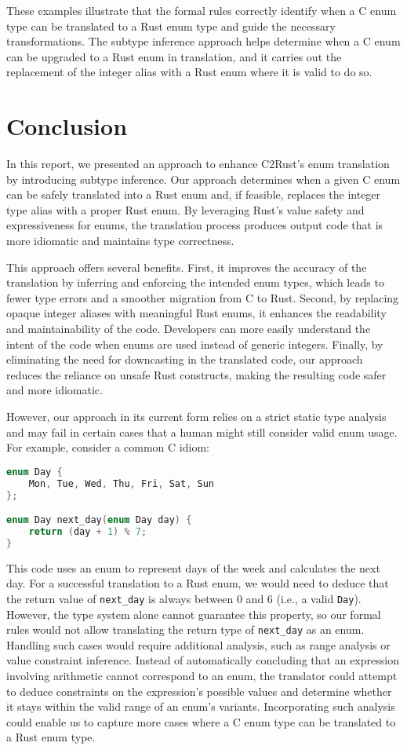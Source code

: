\documentclass[peerreview, 10pt]{IEEEtran}
\begin{document}
These examples illustrate that the formal rules correctly identify when a C enum type can be translated to a Rust enum type and guide the necessary transformations. The subtype inference approach helps determine when a C enum can be upgraded to a Rust enum in translation, and it carries out the replacement of the integer alias with a Rust enum where it is valid to do so.

\section{Conclusion}
In this report, we presented an approach to enhance C2Rust's enum translation by introducing subtype inference. Our approach determines when a given C enum can be safely translated into a Rust enum and, if feasible, replaces the integer type alias with a proper Rust enum. By leveraging Rust's value safety and expressiveness for enums, the translation process produces output code that is more idiomatic and maintains type correctness.

This approach offers several benefits. First, it improves the accuracy of the translation by inferring and enforcing the intended enum types, which leads to fewer type errors and a smoother migration from C to Rust. Second, by replacing opaque integer aliases with meaningful Rust enums, it enhances the readability and maintainability of the code. Developers can more easily understand the intent of the code when enums are used instead of generic integers. Finally, by eliminating the need for downcasting in the translated code, our approach reduces the reliance on unsafe Rust constructs, making the resulting code safer and more idiomatic.

However, our approach in its current form relies on a strict static type analysis and may fail in certain cases that a human might still consider valid enum usage. For example, consider a common C idiom:

\begin{lstlisting}[language=C]
enum Day {
    Mon, Tue, Wed, Thu, Fri, Sat, Sun
};

enum Day next_day(enum Day day) {
    return (day + 1) % 7;
}
\end{lstlisting}

This code uses an enum to represent days of the week and calculates the next day. For a successful translation to a Rust enum, we would need to deduce that the return value of \texttt{next\_day} is always between 0 and 6 (i.e., a valid \texttt{Day}). However, the type system alone cannot guarantee this property, so our formal rules would not allow translating the return type of \texttt{next\_day} as an enum. Handling such cases would require additional analysis, such as range analysis or value constraint inference. Instead of automatically concluding that an expression involving arithmetic cannot correspond to an enum, the translator could attempt to deduce constraints on the expression's possible values and determine whether it stays within the valid range of an enum's variants. Incorporating such analysis could enable us to capture more cases where a C enum type can be translated to a Rust enum type.
\end{document}
